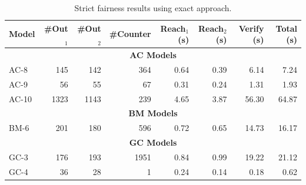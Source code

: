 \begin{table}[htbp]
\centering
\begin{tabular}{|l|r|r|r|r|r|r|r|}
\hline
Model & \#Out$_1$ & \#Out$_2$ & \#Counter & Reach$_1$ (s) & Reach$_2$ (s) & Verify (s) & Total (s) \\
\hline
\multicolumn{8}{|c|}{\textbf{AC Models}} \\
\hline
AC-8 & 145 & 142 & 364 & 0.64 & 0.39 & 6.14 & 7.24 \\
AC-9 & 56 & 55 & 67 & 0.31 & 0.24 & 1.31 & 1.93 \\
AC-10 & 1323 & 1143 & 239 & 4.65 & 3.87 & 56.30 & 64.87 \\
\hline
\multicolumn{8}{|c|}{\textbf{BM Models}} \\
\hline
BM-6 & 201 & 180 & 596 & 0.72 & 0.65 & 14.73 & 16.17 \\
\hline
\multicolumn{8}{|c|}{\textbf{GC Models}} \\
\hline
GC-3 & 176 & 193 & 1951 & 0.84 & 0.99 & 19.22 & 21.12 \\
GC-4 & 36 & 28 & 1 & 0.24 & 0.14 & 0.18 & 0.62 \\
\hline
\end{tabular}
\caption{Strict fairness results using exact approach.}
\label{tab:strict_fair_exact}
\end{table}